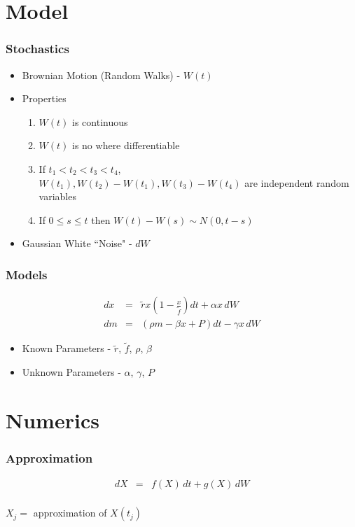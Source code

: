 
\section{Model}

\begin{frame}
    \frametitle{Stochastics}
	\begin{itemize}
		\item Brownian Motion (Random Walks) - $W(t)$
		\item Properties
	\begin{enumerate}[i]
		\item $W(t)$ is continuous
		\item $W(t)$ is no where differentiable
		\item If $t_{1}<t_{2}<t_{3}<t_{4}$, \\
			$W(t_{1}), W(t_{2})-W(t_{1}),  W(t_{3})-W(t_{4})$ are independent random variables
		\item If $0 \le s\le t$ then $W(t)-W(s) \sim N(0, t-s)$
	\end{enumerate}
		\item Gaussian White ``Noise" - $dW$
	\end{itemize}
\end{frame}



\begin{frame}
    \frametitle{Models}
	\begin{eqnarray}
		dx &=& \tilde{r} x \left( 1- \frac{x}{\tilde{f}}\right) dt +\alpha x \, dW \\
		dm &=& ( \rho m - \beta x + P) dt - \gamma x \, dW
	\end{eqnarray}
	\begin{itemize}
		\item Known Parameters - $\tilde{r}$, $\tilde{f}$, $\rho$, $\beta$
		\item Unknown Parameters - $\alpha$, $\gamma$, $P$
	\end{itemize}
\end{frame}




\section{Numerics}

\begin{frame}
   \frametitle{Approximation}
	\begin{eqnarray*}
		dX &=& f(X) \, dt + g(X) \, dW \\
	\end{eqnarray*}
	\begin{center}
		$X_{j} =$ approximation of $X(t_{j})$
	\end{center}
\end{frame}


